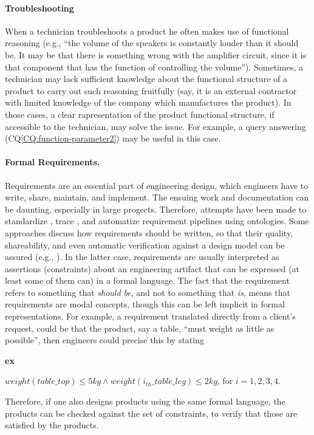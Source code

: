 \documentclass[sw]{iosart2x}
\newcommand{\bflist}{\begin{list}{}{\setlength{\topsep}{2mm}\setlength{\partopsep}{0mm}\setlength{\parsep}{0mm}\setlength{\leftmargin}{9mm}\setlength{\labelwidth}{8mm}}}
\newcommand{\eflist}{\end{list}}
\newcommand{\ExLabel}{\textrm{ex}}
\newcommand{\CQLabel}{\textrm{CQ}}
\newcommand{\myex}[1]{\refstepcounter{cntex}\begin{small}{\bf \ExLabel\thecntex\label{ex:#1}}\end{small}}
\newcounter{cntex}
\newcommand{\refCQ}[1]{({\CQLabel}\ref{#1})}
\newcommand{\qquotes}[1]{``#1''}
\newcommand{\TODO}[1]{{%
}}
\begin{document}
\paragraph{Troubleshooting} When a technician troubleshoots a product he often makes use of functional reasoning (e.g., \qquotes{the volume of the speakers is constantly louder than it should be. It may be that there is something wrong with the amplifier circuit, since it is that component that has the function of controlling the volume}). 
Sometimes, a technician may lack sufficient knowledge about the functional structure of a product to carry out such reasoning fruitfully (say, it is an external contractor with limited knowledge of the company which manufactures the product). 
In those cases, a clear rapresentation of the product functional structure, if accessible to the technician, may solve the issue.
For example, a query answering \refCQ{CQ:function-parameter2} may be useful in this  case.

\paragraph{Formal Requirements.}
Requirements are an essential part of engineering design, which engineers have to write, share, maintain, and implement. 
The ensuing work and documentation can be daunting, especially in large progects. Therefore, attempts have been made to standardize \cite{alrumaihDomainOntologyRequirements2020}, trace \cite{murtazinaOntologybasedApproachSupport2019}, and automatize \cite{holterScopeDetectionTextual2021} requirement pipelines using ontologies. 
Some approaches discuss how requirements should be written, so that their quality, shareability, and even automatic verification against a design model can be assured (e.g., \cite{jinxinlinRequirementOntologyEngineering1996, chenOntologybasedRequirementVerification2020}).
In the latter case, requirements are usually interpreted as assertions (constraints) about an engineering artifact that can be expressed (at least some of them can) in a formal language. 
The fact that the requirement refers to something that \textit{should be}, and not to something that \textit{is}, means that requirements are modal concepts, though this can be left implicit in formal representations.  
For example, a requirement translated directly from a client's request, could be that the product, say a table, \qquotes{must weight as little as possible}, then engineers could precise this by stating 
\bflist
  \item[\myex{req1}] $ weight(table\_top) \leq 5kg \land weight(i_{th}\_table\_leg) \leq 2kg$, for $i = 1,2,3,4$. 
\eflist
Therefore, if one also designs products using the same formal language, the products can be checked against the set of constraints, to verify that those are satisfied by the products.
\end{document}

